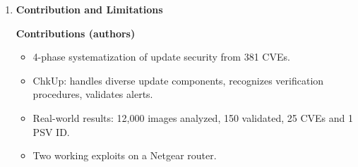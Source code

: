\documentclass[11pt,a4paper]{article}
\newcommand{\entrypart}[1]{\textbf{\color{accent}#1}\par\vspace{2pt}}
\begin{document}
\begin{enumerate}
\begin{itemize}
        \begin{itemize}
            \item 93.4\% done within 600 s.
            \item Paths resolved for 10,670 images. 15,132 alerts. 1,330 images unresolved.
            \item Most common issue: improper integrity verification (39.0\% CRC, 23.8\% MD5).
            \item Most alerts: network devices and cameras.
        \end{itemize}
        \item \textbf{Overall on $D_G$:} TPR 86.7\%, FPR 5.3\%.
        \item \textbf{Disclosure:} 25 CVE IDs, 1 PSV ID. Mostly CWE-345 and CWE-20. Asus results were n-day (CVE-2014-2718, CVE-2020-15498, CVE-2021-3166). 29 other device families were zero-day.
        \item \textbf{Case study (Netgear WNR)}
        \begin{itemize}
            \item Freshness and compatibility checked via filename on front end.
            \item Integrity: CRC. Authenticity: missing.
            \item Built a downgrade attack and a modification attack.
            \item Both work over the same network or by MITM, since update uses plain HTTP.
        \end{itemize}
    \end{itemize}

    \item \entrypart{Contribution and Limitations}

    \textbf{Contributions (authors)}
    \begin{itemize}
        \item 4-phase systematization of update security from 381 CVEs.
        \item ChkUp: handles diverse update components, recognizes verification procedures, validates alerts.
        \item Real-world results: 12,000 images analyzed, 150 validated, 25 CVEs and 1 PSV ID.
        \item Two working exploits on a Netgear router.
    \end{itemize}


\end{enumerate}
\end{document}
